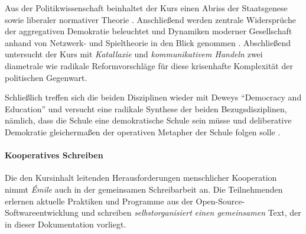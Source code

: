 Aus der Politikwissenschaft beinhaltet der Kurs einen Abriss der Staatsgenese \parencite{Tilly-1985-aa} sowie liberaler normativer Theorie \parencites{Dahl-1989-aa}.
Anschließend werden zentrale Widersprüche \parencite{Condorcet1785,Arrow1950} der aggregativen Demokratie beleuchtet und Dynamiken moderner Gesellschaft anhand von Netzwerk- und Spieltheorie in den Blick genommen \parencite{Kleinberg-2009-oz}.
Abschließend untersucht der Kurs mit \emph{Katallaxie} \parencite{hayek-1945} und \emph{kommunikativem Handeln} \parencite{Habermas-1998-aa} zwei diametrale wie radikale Reformvorschläge für diese krisenhafte Komplexität der politischen Gegenwart.

Schließlich treffen sich die beiden Disziplinen wieder mit Deweys ``Democracy and Education'' \parencite*{Dewey-1916} und versucht eine radikale Synthese der beiden Bezugsdisziplinen, nämlich, dass die Schule eine demokratische Schule sein müsse und deliberative Demokratie gleichermaßen der operativen Metapher der Schule folgen solle \parencite{Rosenberg-2002-aa}.



\paragraph{Kooperatives Schreiben}

Die den Kursinhalt leitenden Herausforderungen menschlicher Kooperation nimmt \emph{Émile} auch in der gemeinsamen Schreibarbeit an.
Die Teilnehmenden erlernen aktuelle Praktiken und Programme aus der Open-Source-Softwareentwicklung und schreiben \emph{selbstorganisiert} \emph{einen gemeinsamen} Text, der in dieser Dokumentation vorliegt.
